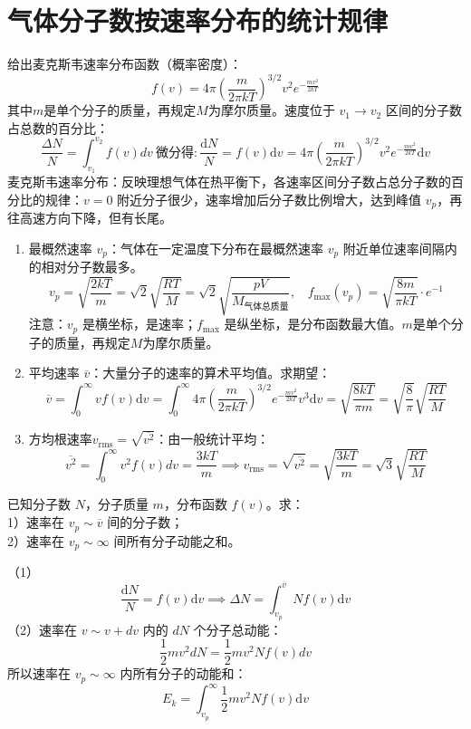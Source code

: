 \documentclass[lang=cn,11pt]{elegantbook}
\begin{document}
\section{气体分子数按速率分布的统计规律}

\begin{definition}[三种统计速率]
给出麦克斯韦速率分布函数（概率密度）：
\[
f(v)=4\pi\left(\frac{m}{2\pi kT}\right)^{3/2}v^2e^{-\frac{mv^2}{2kT}}
\]其中$m$是单个分子的质量，再规定$M$为摩尔质量。速度位于 \(v_1\to v_2\) 区间的分子数占总数的百分比：
\[\frac{\Delta N}{N}=\int_{v_1}^{v_2}f(v)dv~\text{微分得}:\frac{\mathrm dN}{N}=f(v)\mathrm dv=4\pi\left(\frac{m}{2\pi kT}\right)^{3/2}v^2e^{-\frac{mv^2}{2kT}}\mathrm dv\]麦克斯韦速率分布：反映理想气体在热平衡下，各速率区间分子数占总分子数的百分比的规律：\(v=0\) 附近分子很少，速率增加后分子数比例增大，达到峰值 \(v_p\)，再往高速方向下降，但有长尾。
\begin{enumerate}
    \item 最概然速率 \(v_p\)：气体在一定温度下分布在最概然速率 \(v_p\) 附近单位速率间隔内的相对分子数最多。
    \[v_p=\sqrt{\frac{2kT}{m}}=\sqrt2\sqrt{\frac{RT}{M}}=\sqrt2\sqrt{\frac{pV}{M_{气体总质量}}},~~~~f_{\max}(v_p)=\sqrt{\frac{8m}{\pi kT}}\cdot e^{-1}\]注意：\(v_p\) 是横坐标，是速率；\(f_{\max}\) 是纵坐标，是分布函数最大值。$m$是单个分子的质量，再规定$M$为摩尔质量。
    \item 平均速率 \(\overline v\)：大量分子的速率的算术平均值。求期望：
\[\overline v=\int_0^\infty vf(v)\mathrm dv=\int_0^\infty 4\pi\left(\frac{m}{2\pi kT}\right)^{3/2}e^{-\frac{mv^2}{2kT}}v^3\mathrm dv=\sqrt{\frac{8kT}{\pi m}}=\sqrt{\frac{8}{\pi }}\sqrt{\dfrac{RT}{M}}\]
\item 方均根速率\(v_{\text{rms}}=\sqrt{\overline{v^2}}\)：由一般统计平均：
\[\overline{v^2}=\int_0^\infty v^2f(v)dv=\frac{3kT}{m}\implies v_{\text{rms}}=\sqrt{\overline{v^2}}=\sqrt{\frac{3kT}{m}}=\sqrt3\sqrt{\frac{RT}{M}}\]
\end{enumerate}
\end{definition}

\begin{exercise}
已知分子数 \(N\)，分子质量 \(m\)，分布函数 \(f(v)\)。求：\\
1）速率在 \(v_p\sim \overline v\) 间的分子数；\\
2）速率在 \(v_p\sim\infty\) 间所有分子动能之和。
\end{exercise}
\begin{solution}
（1）\[\frac{\mathrm dN}{N}=f(v)\mathrm dv\implies \Delta N=\int_{v_p}^{\overline v}Nf(v)\mathrm dv\]
（2）速率在 \(v\sim v+dv\) 内的 \(dN\) 个分子总动能：\[\frac12mv^2dN=\frac12mv^2Nf(v)dv\]所以速率在 \(v_p\sim\infty\) 内所有分子的动能和：\[E_k=\int_{v_p}^{\infty}\frac12mv^2Nf(v)\mathrm dv\]
\end{solution}
\end{document}
